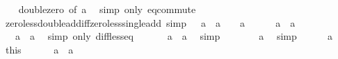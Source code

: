\begin{isabellebody}
%
\isadelimproof
\ \ %
\endisadelimproof
%
\isatagproof
{}\isamarkupfalse%
\ double{\isacharunderscore}{\kern0pt}zero\ {\isacharbrackleft}{\kern0pt}of\ a{\isacharbrackright}{\kern0pt}\ \isamarkupfalse%
\ {\isacharparenleft}{\kern0pt}simp\ only{\isacharcolon}{\kern0pt}\ eq{\isacharunderscore}{\kern0pt}commute{\isacharparenright}{\kern0pt}%
\endisatagproof
{\isafoldproof}%
%
\isadelimproof
\isanewline
%
\endisadelimproof
\isanewline
{}\isamarkupfalse%
\ zero{\isacharunderscore}{\kern0pt}less{\isacharunderscore}{\kern0pt}double{\isacharunderscore}{\kern0pt}add{\isacharunderscore}{\kern0pt}iff{\isacharunderscore}{\kern0pt}zero{\isacharunderscore}{\kern0pt}less{\isacharunderscore}{\kern0pt}single{\isacharunderscore}{\kern0pt}add\ {\isacharbrackleft}{\kern0pt}simp{\isacharbrackright}{\kern0pt}{\isacharcolon}{\kern0pt}\ {\isachardoublequoteopen}{}\ {\isacharless}{\kern0pt}\ a\ {\isacharplus}{\kern0pt}\ a\ {\isasymlongleftrightarrow}\ {}\ {\isacharless}{\kern0pt}\ a{\isachardoublequoteclose}\isanewline
%
\isadelimproof
%
\endisadelimproof
%
\isatagproof
{}\isamarkupfalse%
\isanewline
\ \ \isamarkupfalse%
\ {\isachardoublequoteopen}{}\ {\isacharless}{\kern0pt}\ a\ {\isacharplus}{\kern0pt}\ a{\isachardoublequoteclose}\isanewline
\ \ \isamarkupfalse%
\ \isamarkupfalse%
\ {\isachardoublequoteopen}{}\ {\isacharminus}{\kern0pt}\ a\ {\isacharless}{\kern0pt}\ a{\isachardoublequoteclose}\ \isamarkupfalse%
\ {\isacharparenleft}{\kern0pt}simp\ only{\isacharcolon}{\kern0pt}\ diff{\isacharunderscore}{\kern0pt}less{\isacharunderscore}{\kern0pt}eq{\isacharparenright}{\kern0pt}\isanewline
\ \ \isamarkupfalse%
\ \isamarkupfalse%
\ {\isachardoublequoteopen}{\isacharminus}{\kern0pt}\ a\ {\isacharless}{\kern0pt}\ a{\isachardoublequoteclose}\ \isamarkupfalse%
\ simp\isanewline
\ \ \isamarkupfalse%
\ \isamarkupfalse%
\ {\isachardoublequoteopen}{}\ {\isacharless}{\kern0pt}\ a{\isachardoublequoteclose}\ \isamarkupfalse%
\ simp\isanewline
{}\isamarkupfalse%
\isanewline
\ \ \isamarkupfalse%
\ {\isachardoublequoteopen}{}\ {\isacharless}{\kern0pt}\ a{\isachardoublequoteclose}\isanewline
\ \ \isamarkupfalse%
\ this\ \isamarkupfalse%
\ {\isachardoublequoteopen}{}\ {\isacharplus}{\kern0pt}\ {}\ {\isacharless}{\kern0pt}\ a\ {\isacharplus}{\kern0pt}\ a{\isachardoublequoteclose}\isanewline

\end{isabellebody}
